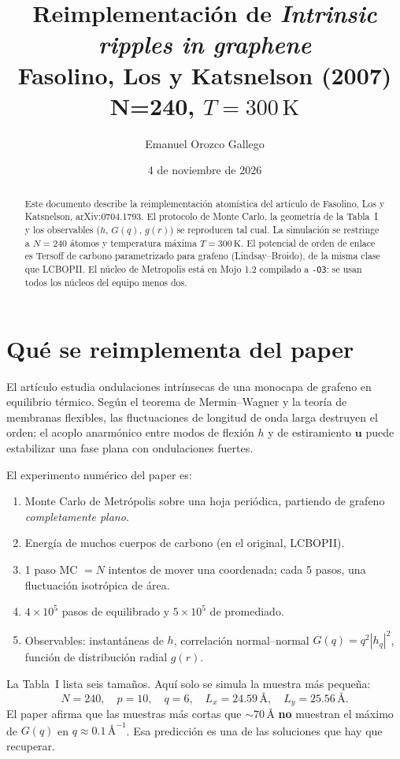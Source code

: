 \documentclass[11pt,a4paper]{article}
\title{Reimplementación de \emph{Intrinsic ripples in graphene}\\[0.35em]
\large Fasolino, Los y Katsnelson (2007)\\
N=240, $T=300\,\mathrm{K}$}
\author{Emanuel Orozco Gallego}
\date{4 de noviembre de 2026}
\begin{document}
\maketitle

\begin{abstract}
Este documento describe la reimplementación atomística del artículo de Fasolino, Los y Katsnelson, arXiv:0704.1793. El protocolo de Monte Carlo, la geometría de la Tabla~I y los observables ($h$, $G(q)$, $g(r)$) se reproducen tal cual. La simulación se restringe a $N=240$ átomos y temperatura máxima $T=300\,\mathrm{K}$. El potencial de orden de enlace es Tersoff de carbono parametrizado para grafeno (Lindsay--Broido), de la misma clase que LCBOPII. El núcleo de Metropolis está en Mojo 1.2 compilado a \texttt{-O3}: se usan todos los núcleos del equipo menos dos.
\end{abstract}

\tableofcontents
\vspace{0.6em}

\section{Qué se reimplementa del paper}

El artículo estudia ondulaciones intrínsecas de una monocapa de grafeno en equilibrio térmico. Según el teorema de Mermin--Wagner y la teoría de membranas flexibles, las fluctuaciones de longitud de onda larga destruyen el orden; el acoplo anarmónico entre modos de flexión $h$ y de estiramiento $\mathbf{u}$ puede estabilizar una fase plana con ondulaciones fuertes.

El experimento numérico del paper es:
\begin{enumerate}
  \item Monte Carlo de Metrópolis sobre una hoja periódica, partiendo de grafeno \emph{completamente plano}.
  \item Energía de muchos cuerpos de carbono (en el original, LCBOPII).
  \item 1 paso MC $= N$ intentos de mover una coordenada; cada 5 pasos, una fluctuación isotrópica de área.
  \item $4\times 10^5$ pasos de equilibrado y $5\times 10^5$ de promediado.
  \item Observables: instantáneas de $h$, correlación normal--normal $G(q)=q^2|h_q|^2$, función de distribución radial $g(r)$.
\end{enumerate}

La Tabla~I lista seis tamaños. Aquí solo se simula la muestra más pequeña:
\[
N=240,\quad p=10,\quad q=6,\quad L_x=24.59\,\text{\AA},\quad L_y=25.56\,\text{\AA}.
\]
El paper afirma que las muestras más cortas que $\sim 70\,\text{\AA}$ \textbf{no} muestran el máximo de $G(q)$ en $q\approx 0.1\,\text{\AA}^{-1}$. Esa predicción es una de las soluciones que hay que recuperar.
\end{document}
